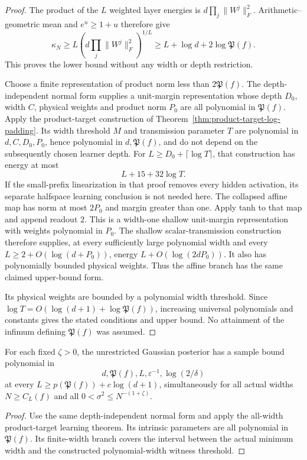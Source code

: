 \begin{proof}
The product of the $L$ weighted layer energies is
$d\prod_j\|W^j\|_F^2$. Arithmetic--geometric mean and
$e^u\ge1+u$ therefore give
\[
 \kappa_N\ge L\left(d\prod_j\|W^j\|_F^2\right)^{1/L}
 \ge L+\log d+2\log\mathfrak P(f).
\]
This proves the lower bound without any width or depth restriction.

Choose a finite representation of product norm less than
$2\mathfrak P(f)$. The depth-independent normal form supplies a
unit-margin representation whose depth $D_0$, width $C$, physical
weights and product norm $P_0$ are all polynomial in $\mathfrak P(f)$.
Apply the product-target construction of
Theorem~\ref{thm:product-target-log-padding}. Its width threshold $M$
and transmission parameter $T$ are polynomial in $d,C,D_0,P_0$,
hence polynomial in $d,\mathfrak P(f)$, and do not depend on the
subsequently chosen learner depth. For
$L\ge D_0+\lceil\log T\rceil$, that construction has energy at most
\[
 L+15+32\log T.
\]
If the small-prefix linearization in that proof removes every hidden
activation, its separate halfspace learning conclusion is not needed
here. The collapsed affine map has norm at most $2P_0$ and margin
greater than one. Apply tanh to that map and append readout $2$.
This is a width-one shallow unit-margin representation with weights
polynomial in $P_0$. The shallow scalar-transmission construction
therefore supplies, at every sufficiently large polynomial width and
every $L\ge2+O(\log(d+P_0))$, energy
$L+O(\log(2dP_0))$. It also has polynomially bounded physical weights.
Thus the affine branch has the same claimed upper-bound form.

Its physical weights are bounded by a polynomial width threshold.
Since $\log T=O(\log(d+1)+\log\mathfrak P(f))$, increasing universal
polynomials and constants gives the stated conditions and upper
bound. No attainment of the infimum defining $\mathfrak P(f)$ was
assumed.
\end{proof}

\begin{corollary}
\label{cor:intrinsic-product-learning}
For each fixed $\zeta>0$, the unrestricted Gaussian posterior has a
sample bound polynomial in
\[
 d,\mathfrak P(f),L,\varepsilon^{-1},\log(2/\delta)
\]
at every $L\ge p(\mathfrak P(f))+c\log(d+1)$, simultaneously for
all actual widths $N\ge C_L(f)$ and all
$0<\sigma^2\le N^{-(1+\zeta)}$.
\end{corollary}

\begin{proof}
Use the same depth-independent normal form and apply the all-width
product-target learning theorem. Its intrinsic parameters are all
polynomial in $\mathfrak P(f)$. Its finite-width branch covers the
interval between the actual minimum width and the constructed
polynomial-width witness threshold.
\end{proof}

